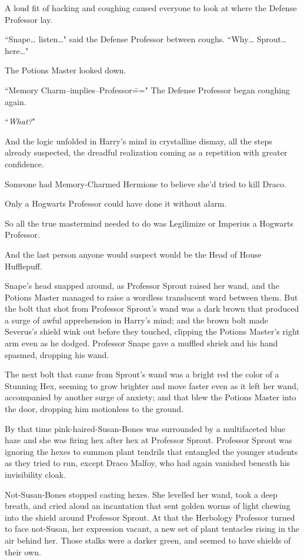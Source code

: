 A loud fit of hacking and coughing caused everyone to look at where the Defense Professor lay.

``Snape{\ldots} listen{\ldots}" said the Defense Professor between coughs. ``Why{\ldots} Sprout{\ldots} here{\ldots}"

The Potions Master looked down.

``Memory Charm\---implies\---Professor\===" The Defense Professor began coughing again.

``\emph{What?}"

And the logic unfolded in Harry's mind in crystalline dismay, all the steps already suspected, the dreadful realization coming as a repetition with greater confidence.

Someone had Memory-Charmed Hermione to believe she'd tried to kill Draco.

Only a Hogwarts Professor could have done it without alarm.

So all the true mastermind needed to do was Legilimize or Imperius a Hogwarts Professor.

And the last person anyone would suspect would be the Head of House Hufflepuff.

Snape's head snapped around, as Professor Sprout raised her wand, and the Potions Master managed to raise a wordless translucent ward between them. But the bolt that shot from Professor Sprout's wand was a dark brown that produced a surge of awful apprehension in Harry's mind; and the brown bolt made Severus's shield wink out before they touched, clipping the Potions Master's right arm even as he dodged. Professor Snape gave a muffled shriek and his hand spasmed, dropping his wand.

The next bolt that came from Sprout's wand was a bright red the color of a Stunning Hex, seeming to grow brighter and move faster even as it left her wand, accompanied by another surge of anxiety; and that blew the Potions Master into the door, dropping him motionless to the ground.

By that time pink-haired-Susan-Bones was surrounded by a multifaceted blue haze and she was firing hex after hex at Professor Sprout. Professor Sprout was ignoring the hexes to summon plant tendrils that entangled the younger students as they tried to run, except Draco Malfoy, who had again vanished beneath his invisibility cloak.

Not-Susan-Bones stopped casting hexes. She levelled her wand, took a deep breath, and cried aloud an incantation that sent golden worms of light chewing into the shield around Professor Sprout. At that the Herbology Professor turned to face not-Susan, her expression vacant, a new set of plant tentacles rising in the air behind her. Those stalks were a darker green, and seemed to have shields of their own.

